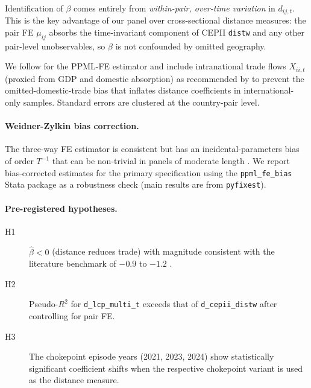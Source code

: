 \documentclass[11pt, a4paper]{article}
\begin{document}
Identification of $\beta$ comes entirely from \emph{within-pair, over-time
variation} in $d_{ij,t}$.  This is the key advantage of our panel over
cross-sectional distance measures: the pair FE $\mu_{ij}$ absorbs the
time-invariant component of CEPII \texttt{distw} and any other
pair-level unobservables, so $\beta$ is not confounded by omitted
geography.

We follow \citet{correia_guimaraes_zylkin_2020} for the PPML-FE estimator and
include intranational trade flows $X_{ii,t}$ (proxied from GDP and domestic
absorption) as recommended by \citet{heid_larch_yotov_2021} to prevent the
omitted-domestic-trade bias that inflates distance coefficients in
international-only samples.  Standard errors are clustered at the country-pair
level.

\paragraph{Weidner-Zylkin bias correction.}
The three-way FE estimator is consistent but has an incidental-parameters
bias of order $T^{-1}$ that can be non-trivial in panels of moderate length
\citep{weidner_zylkin_2021}.  We report bias-corrected estimates for the
primary specification using the \texttt{ppml\_fe\_bias} Stata package as a
robustness check (main results are from \texttt{pyfixest}).

\paragraph{Pre-registered hypotheses.}
\begin{description}
  \item[H1] $\hat{\beta} < 0$ (distance reduces trade) with magnitude
    consistent with the literature benchmark of $-0.9$ to $-1.2$
    \citep{disdier_head_2008, head_mayer_2014}.
  \item[H2] Pseudo-$R^2$ for \texttt{d\_lcp\_multi\_t} exceeds that of
    \texttt{d\_cepii\_distw} after controlling for pair FE.
  \item[H3] The chokepoint episode years (2021, 2023, 2024) show
    statistically significant coefficient shifts when the respective
    chokepoint variant is used as the distance measure.
\end{description}
\end{document}
